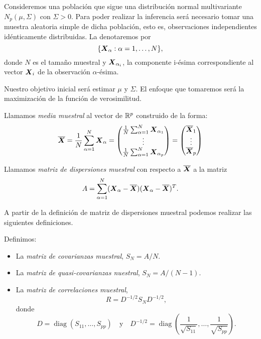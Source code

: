 Consideremos una población que sigue una distribución normal multivariante $N_p(\mu,\Sigma)$ con $\Sigma > 0$. Para poder realizar la inferencia será necesario tomar una muestra aleatoria simple de dicha población, esto es, observaciones independientes idénticamente distribuidas. La denotaremos por
\[
\{\boldsymbol{X}_\alpha: \alpha= 1 ,\dots,N\},
\]
donde $N$ es el tamaño muestral y $\boldsymbol{X}_{\alpha_i}$, la componente i-ésima correspondiente al vector $\boldsymbol{X}_i$ de la observación $\alpha$-ésima.

Nuestro objetivo inicial será estimar $\mu$ y $\Sigma$. El enfoque que tomaremos será la maximización de la función de verosimilitud.

\begin{ndef}
  Llamamos \textit{media muestral} al vector de $\mathbb{R}^p$ construido de la forma:
  \[
  \overline{\boldsymbol{X}} = \frac{1}{N} \sum_{\alpha = 1 }^N \boldsymbol{X}_\alpha 
  = \begin{pmatrix}
      \frac{1}{N} \sum_{\alpha = 1 }^N \boldsymbol{X}_{\alpha_1} \\ 
      \vdots \\ 
      \frac{1}{N} \sum_{\alpha = 1 }^N \boldsymbol{X}_{\alpha_p}
    \end{pmatrix} 
  = \begin{pmatrix}
      \overline{\boldsymbol{X}}_1 \\ 
      \vdots \\ 
      \overline{\boldsymbol{X}}_p 
    \end{pmatrix}
  \]
\end{ndef}

\begin{ndef}
  Llamamos \textit{matriz de dispersiones muestral} con respecto a $\overline{\boldsymbol{X}}$ a la matriz
  \[
    A = \sum_{\alpha = 1}^N (\boldsymbol{X}_\alpha - \overline{\boldsymbol{X}})(\boldsymbol{X}_\alpha - \overline{\boldsymbol{X}})^T.
  \]
\end{ndef}
A partir de la definición de matriz de dispersiones muestral podemos realizar las siguientes definiciones.
\begin{ndef}
  Definimos:
  \begin{itemize}
    \item La \textit{matriz de covarianzas muestral}, $S_N = A/N$.
    \item La \textit{matriz de quasi-covarianzas nuestral}, $S_N = A/(N-1)$.
    \item La \textit{matriz de correlaciones muestral}, 
    \[
      R =D^{-1/2}S_N D^{-1/2},
    \] donde 
    \[
      D = \operatorname{diag}(S_{11},\dots, S_{pp}) 
      \quad \text{y} \quad 
      D^{-1/2} = \operatorname{diag}\left(
        \frac{1}{\sqrt{S_{11}}},\dots,\frac{1}{\sqrt{S_{pp}}}
      \right).
    \]
    \end{itemize}
\end{ndef}

